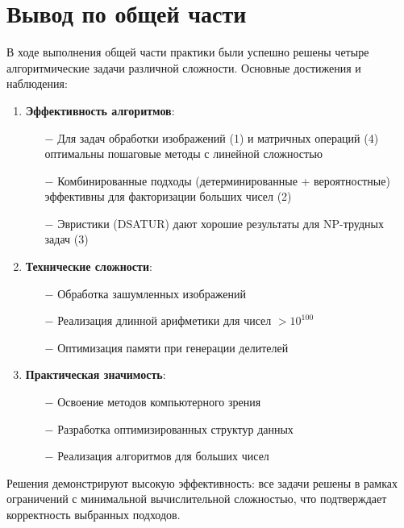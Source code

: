 \documentclass[oneside,a4paper,14pt]{extarticle}
\begin{document}
\clearpage

\section{Вывод по общей части}

В ходе выполнения общей части практики были успешно решены четыре алгоритмические задачи различной сложности. Основные достижения и наблюдения:

\begin{enumerate}
    \item \textbf{Эффективность алгоритмов}:
    \begin{itemize}
        \item[$-$] Для задач обработки изображений (1) и матричных операций (4) оптимальны пошаговые методы с линейной сложностью
        \item[$-$] Комбинированные подходы (детерминированные + вероятностные) эффективны для факторизации больших чисел (2)
        \item[$-$] Эвристики (DSATUR) дают хорошие результаты для NP-трудных задач (3)
    \end{itemize}
    
    \item \textbf{Технические сложности}:
    \begin{itemize}
        \item[$-$] Обработка зашумленных изображений
        \item[$-$] Реализация длинной арифметики для чисел $>10^{100}$
        \item[$-$] Оптимизация памяти при генерации делителей
    \end{itemize}
    
    \item \textbf{Практическая значимость}:
    \begin{itemize}
        \item[$-$] Освоение методов компьютерного зрения
        \item[$-$] Разработка оптимизированных структур данных
        \item[$-$] Реализация алгоритмов для больших чисел
    \end{itemize}
\end{enumerate}

Решения демонстрируют высокую эффективность: все задачи решены в рамках ограничений с минимальной вычислительной сложностью, что подтверждает корректность выбранных подходов.
\end{document}
